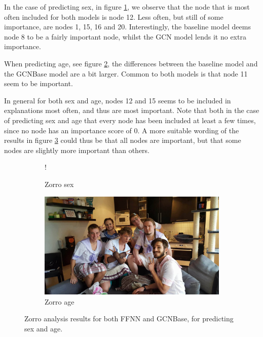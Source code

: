 In the case of predicting sex, in figure \ref{fig:zorro_results_sex}, we observe that the node that is most often included for both models is node 12. Less often, but still of some importance, are nodes 1, 15, 16 and 20. Interestingly, the baseline model deems node 8 to be a fairly important node, whilst the GCN model lends it no extra importance.

When predicting age, see figure \ref{fig:zorro_results_age}, the differences between the baseline model and the GCNBase model are a bit larger. Common to both models is that node 11 seem to be important. 

In general for both sex and age, nodes 12 and 15 seems to be included in explanations most often, and thus are most important. Note that both in the case of predicting sex and age that every node has been included at least a few times, since no node has an importance score of 0. A more suitable wording of the results in figure \ref{fig:zorro_results} could thus be that all nodes are important, but that some nodes are slightly more important than others. 

\begin{figure}[H]
    \centering
        \begin{subfigure}{.5\textwidth}
            \centering
            \begin{center}
                 {!} {
                    
                }
            \end{center}
            \caption{Zorro sex}
            \label{fig:zorro_results_sex}
        \end{subfigure}%
        \begin{subfigure}{.5\textwidth}
            \centering
            \includegraphics[width=.9\linewidth]{chapters/images_theory/placeholder.jpg}
            \caption{Zorro age}
            \label{fig:zorro_results_age}
        \end{subfigure}
    \caption{Zorro analysis results for both FFNN and GCNBase, for predicting sex and age.}
    \label{fig:zorro_results}
\end{figure}

